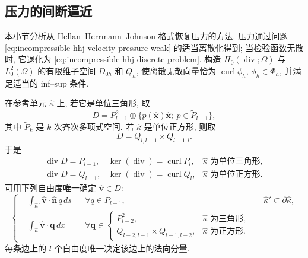 \subsection{压力的间断逼近}
\label{subsec:incompressible-hhj-discontinuous-pressure}

本小节分析从 Hellan--Herrmann--Johnson 格式恢复压力的方法.
压力通过问题 \eqref{eq:incompressible-hhj-velocity-pressure-weak}
的适当离散化得到; 当检验函数无散时, 它退化为
\eqref{eq:incompressible-hhj-discrete-problem}.
构造 $H_0(\operatorname{div};\Omega)$ 与 $L_0^2(\Omega)$
的有限维子空间 $D_{0h}$ 和 $Q_h$, 使离散无散向量恰为
$\operatorname{curl}\phi_h$, $\phi_h\in\Phi_h$, 并满足适当的 inf--sup 条件.

在参考单元 $\widehat\kappa$ 上, 若它是单位三角形, 取
\begin{equation}\label{eq:incompressible-hhj-pressure-reference-triangle}
D=P_{l-1}^2\oplus
\{p(\widehat{\mathbf x})\widehat{\mathbf x};
\ p\in\widetilde P_{l-1}\},
\end{equation}
其中 $\widetilde P_k$ 是 $k$ 次齐次多项式空间.
若 $\widehat\kappa$ 是单位正方形, 则取
\begin{equation}\label{eq:incompressible-hhj-pressure-reference-square}
D=Q_{l,l-1}\times Q_{l-1,l}.
\end{equation}
于是
\[
\begin{array}{lll}
\operatorname{div}D=P_{l-1},&
\ker(\operatorname{div})=\operatorname{curl}P_l,
&\widehat\kappa\text{ 为单位三角形},\\
\operatorname{div}D=Q_{l-1},&
\ker(\operatorname{div})=\operatorname{curl}Q_l,
&\widehat\kappa\text{ 为单位正方形}.
\end{array}
\]
可用下列自由度唯一确定 $\widehat{\mathbf v}\in D$:
\begin{equation}\label{eq:incompressible-hhj-pressure-reference-dofs}
\left\{
\begin{aligned}
&\int_{\widehat\kappa'}\widehat{\mathbf v}\cdot\widehat{\mathbf n}\,q\,ds
&&\forall q\in P_{l-1},
&&\widehat\kappa'\subset\partial\widehat\kappa,\\
&\int_{\widehat\kappa}\widehat{\mathbf v}\cdot\mathbf q\,dx
&&\forall\mathbf q\in
\begin{cases}
P_{l-2}^2,&\widehat\kappa\text{ 为三角形},\\
Q_{l-2,l-1}\times Q_{l-1,l-2},&\widehat\kappa\text{ 为正方形}.
\end{cases}
\end{aligned}
\right.
\end{equation}
每条边上的 $l$ 个自由度唯一决定该边上的法向分量.

